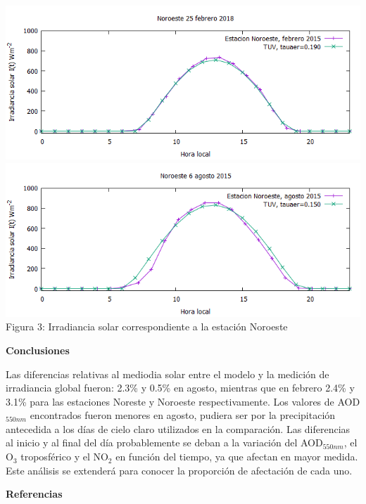 \documentclass{article}
\begin{document}
\begin{multicols}{2}
\begin{center}
\includegraphics[scale=0.44]{images/nof.png}\\
\includegraphics[scale=0.44]{images/nag.png}\\
\changefontsizes{12pt}
Figura 3: Irradiancia solar correspondiente a la estación Noroeste\\
\end{center}
\vspace*{-0.62cm}
\begin{center}
\large \textbf{\textcolor{rb}{Conclusiones}}
\end{center}
\vspace*{-0.3cm}
Las diferencias relativas al mediodia solar entre el modelo y la medición de irradiancia global fueron: 2.3\% y 0.5\% en agosto, mientras que en febrero 2.4\% y 3.1\% para las estaciones Noreste y Noroeste respectivamente. Los valores de AOD$_{550nm}$ encontrados fueron menores en agosto, pudiera ser por la precipitación antecedida a los días de cielo claro utilizados en la comparación. Las diferencias al inicio y al final del día probablemente se deban a la variación del AOD$_{550nm}$, el O$_3$ troposférico y el NO$_2$ en función del tiempo, ya que afectan en mayor medida. Este análisis se extenderá para conocer la proporción de afectación de cada uno.
\begin{center}
\large \textbf{\textcolor{rb}{Referencias}}
\end{center}
\begin{enumerate}

\end{enumerate}
\end{multicols}
\end{document}
